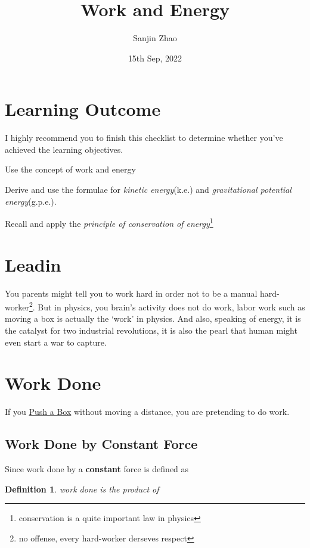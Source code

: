 \documentclass[a4paper]{tufte-handout}
\title{Work and Energy}
\author{Sanjin Zhao}
\date{15th Sep, 2022}  %
\newtheorem{definition}[theorem]{Definition}%
\begin{document}
\maketitle%
\section*{Learning Outcome}
I highly recommend you to finish this checklist to determine whether you've achieved the learning objectives.
\begin{todolist}
  \item Use the concept of work and energy
  \item Derive and use the formulae for \emph{kinetic energy}(k.e.) and \emph{gravitational potential energy}(g.p.e.).
  \item Recall and apply the \emph{principle of conservation of energy}\footnote{conservation is a quite important law in physics}
\end{todolist}
\clearpage

\section{Leadin}
You parents might tell you to work hard in order not to be a manual hard-worker\footnote{no offense, every hard-worker derseves respect}. But in physics, you brain's activity does not do work, labor work such as moving a box is actually the `work' in physics. And also, speaking of energy, it is the catalyst for two industrial revolutions, it is also the pearl that human might even start a war to capture.

\section{Work Done}
If you \href{https://phet.colorado.edu/sims/html/energy-skate-park/latest/energy-skate-park_en.html}{Push a Box} without moving a distance, you are pretending to do work. 

\subsection{Work Done by Constant Force}
Since work done by a \textbf{constant} force is defined as
\begin{definition}
work done is the product of \uline{\hfill}\\
\uline{\hfill}
\end{definition}
\end{document}
